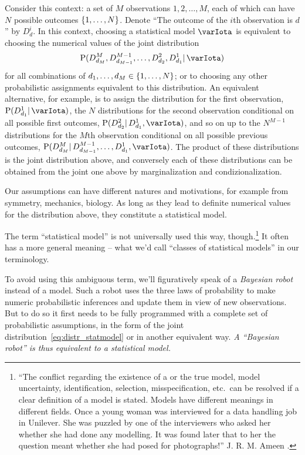\documentclass[\ifafour a4paper,12pt,\else a5paper,10pt,\fi%
onecolumn,oneside,article,%
british%
]{memoir}
\theoremstyle{remark}
\theoremstyle{innote}
\newcommand*{\citep}{\parencites}
\DeclarePairedDelimiter\set{\{}{\}}
\newcommand*{\p}{\mathrm{P}}%
\renewcommand*{\|}{\mathpunct{|}}
\newcommand*{\yI}{\varIota}
\begin{document}
Consider this context: a set of $M$ observations $1,2,\dotsc,M$, each of
which can have $N$ possible outcomes $\set{1,\dotsc,N}$. Denote \enquote{The
  outcome of the $i$th observation is $d$} by $D^i_d$. In this context,
choosing a statistical model $\yI$ is equivalent to choosing the numerical
values of the joint distribution
\begin{equation}
  \label{eq:distr_statmodel}
  \p( D^M_{d_M}, D^{M-1}_{d_{M-1}}, \dotsc,  D^2_{d_2}, D^1_{d_1} \|  \yI)
\end{equation}
for all combinations of $d_1,\dotsc,d_M \in \set{1,\dotsc,N}$; or to
choosing any other probabilistic assignments equivalent to this
distribution. An equivalent alternative, for example, is to assign the
distribution for the first observation, $\p(D^1_{d_1} \|\yI)$, the $N$
distributions for the second observation conditional on all possible first
outcomes, $\p(D^2_{d_2} \|D^1_{d_1}, \yI)$, and so on up to the $N^{M-1}$
distributions for the $M$th observation conditional on all possible
previous outcomes,
$\p(D^M_{d_M} \| D^{M-1}_{d_{M-1}},\dotsc,D^1_{d_1},\yI)$. The product of
these distributions is the joint distribution above, and conversely each of
these distributions can be obtained from the joint one above by
marginalization and condizionalization.

Our assumptions can have different natures and motivations, for example
from symmetry, mechanics, biology. As long as they lead to definite
numerical values for the distribution above, they constitute a statistical
model.

The term \enquote{statistical model} is not universally used this way,
though.\footnote{\enquote{The conflict regarding the existence of a or the
    true model, model uncertainty, identification, selection,
    misspecification, etc.\ can be resolved if a clear definition of a
    model is stated. Models have different meanings in different fields.
    Once a young woman was interviewed for a data handling job in Unilever.
    She was puzzled by one of the interviewers who asked her whether she
    had done any modelling. It was found later that to her the question
    meant whether she had posed for photographs!} J. R. M. Ameen
  \citep[p.~453]{copasetal1995}.} It often has a more general meaning --
what we'd call \enquote{classes of statistical models} in our terminology.

To avoid using this ambiguous term, we'll figuratively speak of a
\emph{Bayesian robot} instead of a model. Such a robot uses the three laws
of probability to make numeric probabilistic inferences and update them in
view of new observations. But to do so it first needs to be fully
programmed with a complete set of probabilistic assumptions, in the form of
the joint distribution~\eqref{eq:distr_statmodel} or in another equivalent
way. \emph{A \enquote{Bayesian robot} is thus equivalent to a statistical
  model.}
\end{document}
